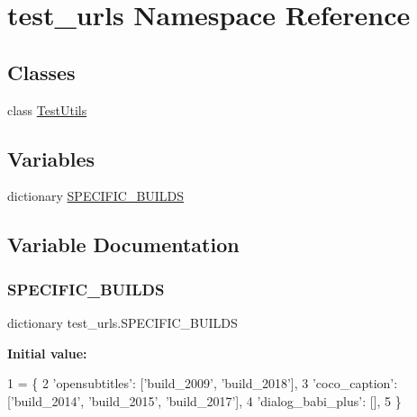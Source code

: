 \hypertarget{namespacetest__urls}{}\section{test\+\_\+urls Namespace Reference}
\label{namespacetest__urls}
\subsection*{Classes}
\begin{DoxyCompactItemize}
\item 
class \hyperlink{classtest__urls_1_1TestUtils}{Test\+Utils}
\end{DoxyCompactItemize}
\subsection*{Variables}
\begin{DoxyCompactItemize}
\item 
dictionary \hyperlink{namespacetest__urls_ad23a76adb8cd1aaad38b46e8b59861b0}{S\+P\+E\+C\+I\+F\+I\+C\+\_\+\+B\+U\+I\+L\+DS}
\end{DoxyCompactItemize}


\subsection{Variable Documentation}
\mbox{\label{namespacetest__urls_ad23a76adb8cd1aaad38b46e8b59861b0}} 
\subsubsection{\texorpdfstring{S\+P\+E\+C\+I\+F\+I\+C\+\_\+\+B\+U\+I\+L\+DS}{SPECIFIC\_BUILDS}}
{\footnotesize\ttfamily dictionary test\+\_\+urls.\+S\+P\+E\+C\+I\+F\+I\+C\+\_\+\+B\+U\+I\+L\+DS}

{\bfseries Initial value\+:}
\begin{DoxyCode}
1 =  \{
2     \textcolor{stringliteral}{'opensubtitles'}: [\textcolor{stringliteral}{'build\_2009'}, \textcolor{stringliteral}{'build\_2018'}],
3     \textcolor{stringliteral}{'coco\_caption'}: [\textcolor{stringliteral}{'build\_2014'}, \textcolor{stringliteral}{'build\_2015'}, \textcolor{stringliteral}{'build\_2017'}],
4     \textcolor{stringliteral}{'dialog\_babi\_plus'}: [],
5 \}
\end{DoxyCode}
